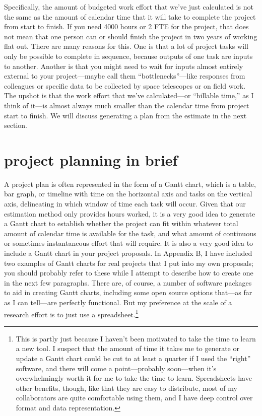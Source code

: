 \documentclass[12pt,oneside]{book}
\begin{document}
Specifically, the amount of budgeted work effort that we've just calculated is not the same as the amount of calendar time that it will take to complete the project from start to finish. If you need 4000 hours or 2 FTE for the project, that does not mean that one person can or should finish the project in two years of working flat out. There are many reasons for this. One is that a lot of project tasks will only be possible to complete in sequence, because outputs of one task are inputs to another. Another is that you might need to wait for inputs almost entirely external to your project---maybe call them ``bottlenecks''---like responses from colleagues or specific data to be collected by space telescopes or on field work. The upshot is that the work effort that we've calculated---or ``billable time,'' as I think of it---is almost always much smaller than the calendar time from project start to finish. We will discuss generating a plan from the estimate in the next section.

\newpage
{}
\chapter*{project planning in brief}

A project plan is often represented in the form of a Gantt chart, which is a table, bar graph, or timeline with time on the horizontal axis and tasks on the vertical axis, delineating in which window of time each task will occur. Given that our estimation method only provides hours worked, it is a very good idea to generate a Gantt chart to establish whether the project can fit within whatever total amount of calendar time is available for the task, and what amount of continuous or sometimes instantaneous effort that will require. It is also a very good idea to include a Gantt chart in your project proposals. In Appendix B, I have included two examples of Gantt charts for real projects that I put into my own proposals; you should probably refer to these while I attempt to describe how to create one in the next few paragraphs. There are, of course, a number of software packages to aid in creating Gantt charts, including some open source options that---as far as I can tell---are perfectly functional. But my preference at the scale of a research effort is to just use a spreadsheet.\footnote{
This is partly just because I haven't been motivated to take the time to learn a new tool. I suspect that the amount of time it takes me to generate or update a Gantt chart could be cut to at least a quarter if I used the ``right'' software, and there will come a point—probably soon—when it's overwhelmingly worth it for me to take the time to learn. Spreadsheets have other benefits, though, like that they are easy to distribute, most of my collaborators are quite comfortable using them, and I have deep control over format and data representation.}
	
\end{document}
